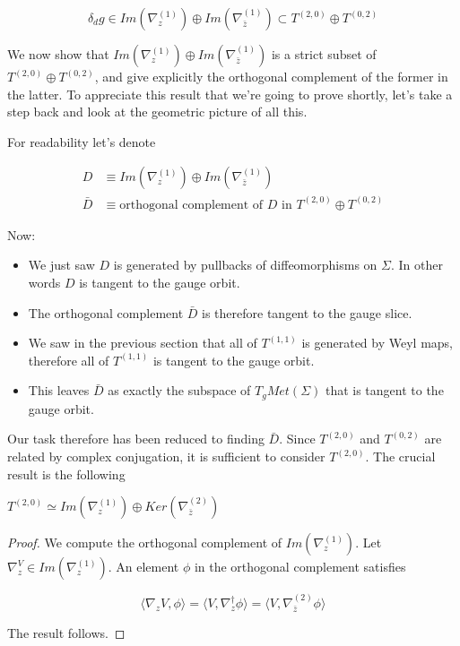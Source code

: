     \begin{equation}
        \delta_d g \in Im(\nabla_z^{(1)}) \oplus Im(\nabla_{\bar z}^{(1)})
        \subset T^{(2,0)} \oplus T^{(0,2)}
    \end{equation}

    We now show that $Im(\nabla_z^{(1)}) \oplus Im(\nabla_{\bar z}^{(1)})$ is a strict subset of $T^{(2,0)} \oplus T^{(0,2)}$, and give explicitly the orthogonal complement of the former in the latter. To appreciate this result that we're going to prove shortly, let's take a step back and look at the geometric picture of all this.

    For readability let's denote

    \begin{align}
        D &\equiv Im(\nabla_z^{(1)}) \oplus Im(\nabla_{\bar z}^{(1)}) \\
        \bar D &\equiv \text{orthogonal complement of } D \text{ in } T^{(2,0)} \oplus T^{(0,2)}
    \end{align}

    Now:

    \begin{itemize}
        \item We just saw $D$ is generated by pullbacks of diffeomorphisms on $\Sigma$. In other words $D$ is tangent to the gauge orbit.
        \item The orthogonal complement $\bar D$ is therefore tangent to the gauge slice.
        \item We saw in the previous section that all of $T^{(1,1)}$ is generated by Weyl maps, therefore all of $T^{(1,1)}$ is tangent to the gauge orbit.
        \item This leaves $\bar D$ as exactly the subspace of $T_g Met(\Sigma)$ that is tangent to the gauge orbit.
    \end{itemize}


    Our task therefore has been reduced to finding $\bar D$. Since $T^{(2, 0)}$ and $T^{(0, 2)}$ are related by complex conjugation, it is sufficient to consider $T^{(2, 0)}$. The crucial result is the following

    \begin{prop}
        $T^{(2,0)} \simeq Im(\nabla^{(1)}_z) \oplus Ker(\nabla^{(2)}_{\bar z})$
    \end{prop}

    \begin{proof}
        We compute the orthogonal complement of $Im(\nabla^{(1)}_z)$. Let $\nabla_{z}^V \in Im(\nabla^{(1)}_z)$. An element $\phi$ in the orthogonal complement satisfies

        \begin{equation}
            \langle \nabla_z V, \phi \rangle = \langle V,  \nabla_z ^\dagger \phi \rangle = \langle V,  \nabla_{\bar z}^{(2)} \phi \rangle
        \end{equation}

        The result follows.
    \end{proof}


